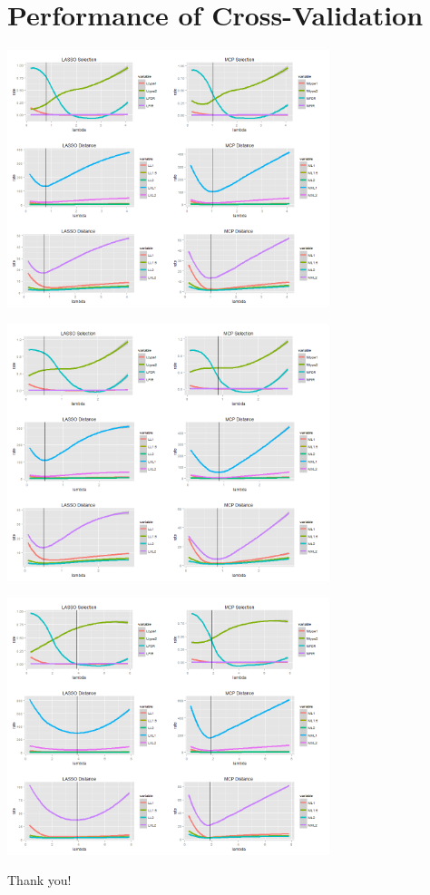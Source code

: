\documentclass{beamer}
\def\frameend{} %
\begin{document}
\section{Performance of Cross-Validation}
\begin{center}
\includegraphics[width = 3.7in]{cov0.png}
\end{center}
\frameend{}

\begin{center}
\includegraphics[width = 3.7in]{cov1.png}
\end{center}
\frameend{}

\begin{center}
\includegraphics[width = 3.7in]{cov2.png}
\end{center}
\frameend{}

\newframe{}
Thank you!
\frameend{}
\end{document}
